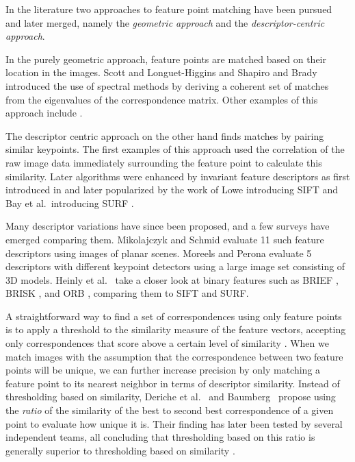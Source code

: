 \documentclass[review]{elsarticle}
\begin{document}
In the literature two approaches to feature point matching have been pursued and later merged, namely the \emph{geometric approach} and the \emph{descriptor-centric approach}.

In the purely geometric approach, feature points are matched based on their location in the images. Scott and Longuet-Higgins \cite{scott1991algorithm} and Shapiro and Brady \cite{shapiro1992feature} introduced the use of spectral methods by deriving a coherent set of matches from the eigenvalues of the correspondence matrix. Other examples of this approach include \cite{sclaroff1995modal,carcassoni2003spectral}.

The descriptor centric approach on the other hand finds matches by pairing similar keypoints. The first examples of this approach used the correlation of the raw image data immediately surrounding the feature point \cite{deriche1994robust,baumberg2000reliable} to calculate this similarity. Later algorithms were enhanced by invariant feature descriptors as first introduced in \cite{schmid1997local} and later popularized by the work of Lowe introducing SIFT \cite{lowe2004sift} and Bay et al.\ introducing SURF \cite{bay2006surf}.

Many descriptor variations have since been proposed, and a few surveys have emerged comparing them. Mikolajczyk and Schmid \cite{mikolajczyk2005performance} evaluate 11 such feature descriptors using images of planar scenes.  Moreels and Perona \cite{moreels2007evaluation} evaluate 5 descriptors with different keypoint detectors using a large image set consisting of 3D models. Heinly et al.\ \cite{heinly2012comparative} take a closer look at binary features such as BRIEF \cite{calonder2010brief}, BRISK \cite{leutenegger2011brisk}, and ORB \cite{rublee2011orb}, comparing them to SIFT and SURF. 

A straightforward way to find a set of correspondences using only feature points is to apply a threshold to the similarity measure of the feature vectors, accepting only correspondences that score above a certain level of similarity \cite{szeliski2010}. When we match images with the assumption that the correspondence between two feature points will be unique, we can further increase precision by only matching a feature point to its nearest neighbor in terms of descriptor similarity. Instead of thresholding based on similarity, Deriche et al.~\cite{deriche1994robust} and Baumberg~\cite{baumberg2000reliable} propose using the \emph{ratio} of the similarity of the best to second best correspondence of a given point to evaluate how unique it is. Their finding has later been tested by several independent teams, all concluding that thresholding based on this ratio is generally superior to thresholding based on similarity \cite{lowe2004sift,mikolajczyk2005performance,moreels2007evaluation,rabin2009statistical}. 
\end{document}
